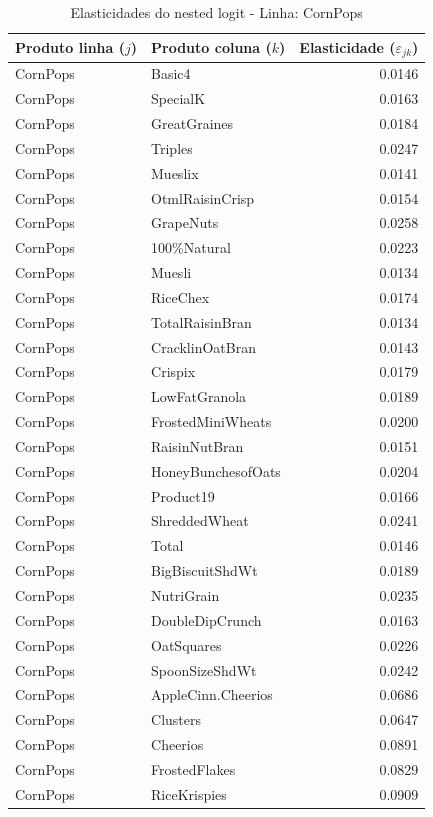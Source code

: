 \begingroup
\begin{table}[H]
\centering
\caption{Elasticidades do nested logit - Linha: CornPops}
\label{tab:elas-nested-cornpops}
\small
\begin{tabular}{llr}
\toprule
Produto linha ($j$) & Produto coluna ($k$) & Elasticidade ($\varepsilon_{jk}$) \\
\midrule
CornPops & Basic4 & 0.0146 \\
CornPops & SpecialK & 0.0163 \\
CornPops & GreatGraines & 0.0184 \\
CornPops & Triples & 0.0247 \\
CornPops & Mueslix & 0.0141 \\
CornPops & OtmlRaisinCrisp & 0.0154 \\
CornPops & GrapeNuts & 0.0258 \\
CornPops & 100\%Natural & 0.0223 \\
CornPops & Muesli & 0.0134 \\
CornPops & RiceChex & 0.0174 \\
CornPops & TotalRaisinBran & 0.0134 \\
CornPops & CracklinOatBran & 0.0143 \\
CornPops & Crispix & 0.0179 \\
CornPops & LowFatGranola & 0.0189 \\
CornPops & FrostedMiniWheats & 0.0200 \\
CornPops & RaisinNutBran & 0.0151 \\
CornPops & HoneyBunchesofOats & 0.0204 \\
CornPops & Product19 & 0.0166 \\
CornPops & ShreddedWheat & 0.0241 \\
CornPops & Total & 0.0146 \\
CornPops & BigBiscuitShdWt & 0.0189 \\
CornPops & NutriGrain & 0.0235 \\
CornPops & DoubleDipCrunch & 0.0163 \\
CornPops & OatSquares & 0.0226 \\
CornPops & SpoonSizeShdWt & 0.0242 \\
CornPops & AppleCinn.Cheerios & 0.0686 \\
CornPops & Clusters & 0.0647 \\
CornPops & Cheerios & 0.0891 \\
CornPops & FrostedFlakes & 0.0829 \\
CornPops & RiceKrispies & 0.0909 \\

\end{tabular}
\end{table}
